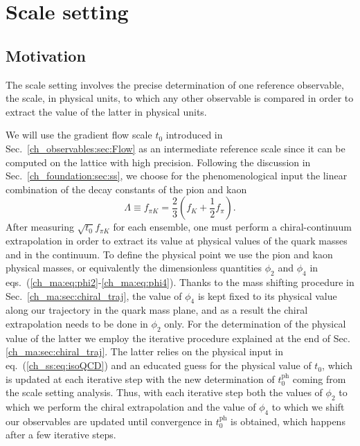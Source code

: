 \chapter{Scale setting}%


\label{ch_ss}


\section{Motivation}
\label{ch_ss:sec:introduction}

The scale setting involves the precise determination of one reference observable, the scale, in physical units, to which any other observable is compared in order to extract the value of the latter in physical units. 

We will use the gradient flow scale $t_0$ introduced in Sec.~\ref{ch_observables:sec:Flow} as an intermediate reference scale since it can be computed on the lattice with high precision. Following the discussion in Sec.~\ref{ch_foundation:sec:ss}, we choose for the phenomenological input the linear combination of the decay constants of the pion and kaon~\citep{Bruno:2016plf}
\begin{equation}
\label{ch_ss:eq:fpik}
\Lambda\equiv f_{\pi K}=\frac{2}{3}\left(f_K+\frac{1}{2}f_{\pi}\right).
\end{equation}
After measuring $\sqrt{t_0}f_{\pi K}$ for each ensemble, one must perform a chiral-continuum extrapolation in order to extract its value at physical values of the quark masses and in the continuum. To define the physical point we use the pion and kaon physical masses, or equivalently the dimensionless quantities $\phi_2$ and $\phi_4$ in eqs.~(\ref{ch_ma:eq:phi2}-\ref{ch_ma:eq:phi4}). Thanks to the mass shifting procedure in Sec.~\ref{ch_ma:sec:chiral_traj}, the value of $\phi_4$ is kept fixed to its physical value along our trajectory in the quark mass plane, and as a result the chiral extrapolation needs to be done in $\phi_2$ only. For the determination of the physical value of the latter we employ the iterative procedure explained at the end of Sec. \ref{ch_ma:sec:chiral_traj}. The latter relies on the physical input in eq.~(\ref{ch_ss:eq:isoQCD}) and an educated guess for the physical value of $t_0$, which is updated at each iterative step with the new determination of $t_0^{\textrm{ph}}$ coming from the scale setting analysis. Thus, with each iterative step both the values of $\phi_2$ to which we perform the chiral extrapolation and the value of $\phi_4$ to which we shift our observables are updated until convergence in $t_0^{\textrm{ph}}$ is obtained, which happens after a few iterative steps.

